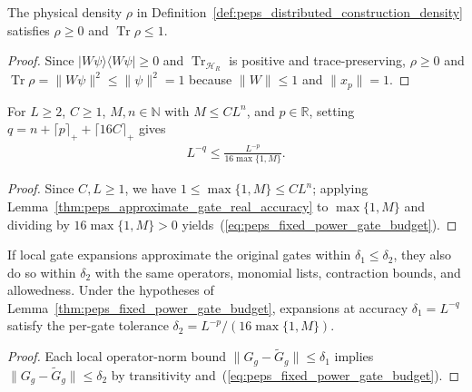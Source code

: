 \begin{lemma}
    \label{thm:peps_distributed_construction_density}
    \leanok
    The physical density $\rho$ in Definition~\ref{def:peps_distributed_construction_density}
    satisfies $\rho\ge 0$ and $\operatorname{Tr}\rho\leq1$.
\end{lemma}
\begin{proof}
    \leanok
    Since $|W\psi\rangle\langle W\psi|\ge 0$ and $\operatorname{Tr}_{\mathcal H_R}$
    is positive and trace-preserving, $\rho\ge 0$ and
    $\operatorname{Tr}\rho=\|W\psi\|^2\le\|\psi\|^2=1$ because $\|W\|\le 1$ and
    $\|x_p\|=1$.
\end{proof}

\begin{lemma}
    \label{thm:peps_fixed_power_gate_budget}
    \leanok
    For $L\ge2$, $C\ge1$, $M,n\in\mathbb N$ with $M\le CL^n$, and $p\in\mathbb R$,
    setting $q=n+\lceil p\rceil_++\lceil16C\rceil_+$ gives
    \begin{align}
        L^{-q}\le \frac{L^{-p}}{16\max\{1,M\}}.
        \label{eq:peps_fixed_power_gate_budget}
    \end{align}
\end{lemma}
\begin{proof}
    \leanok
    Since $C,L\ge1$, we have $1\le\max\{1,M\}\le CL^n$; applying
    Lemma~\ref{thm:peps_approximate_gate_real_accuracy} to $\max\{1,M\}$ and
    dividing by $16\max\{1,M\}>0$ yields~(\ref{eq:peps_fixed_power_gate_budget}).
\end{proof}

\begin{lemma}
    \label{thm:peps_original_approximation_budget}
    \leanok
    If local gate expansions approximate the original gates within $\delta_1\le\delta_2$,
    they also do so within $\delta_2$ with the same operators, monomial lists,
    contraction bounds, and allowedness. Under the hypotheses of
    Lemma~\ref{thm:peps_fixed_power_gate_budget}, expansions at accuracy
    $\delta_1=L^{-q}$ satisfy the per-gate tolerance
    $\delta_2=L^{-p}/(16\max\{1,M\})$.
\end{lemma}
\begin{proof}
    \leanok
    Each local operator-norm bound $\|G_g-\widetilde G_g\|\le\delta_1$ implies
    $\|G_g-\widetilde G_g\|\le\delta_2$ by transitivity and~(\ref{eq:peps_fixed_power_gate_budget}).
\end{proof}

